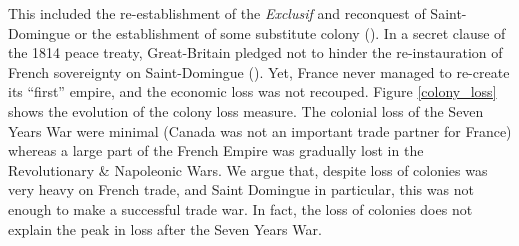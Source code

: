 \documentclass[12pt,a4paper,notitlepage,english]{article}
\begin{document}
This included the re-establishment of the \textit{Exclusif} and reconquest of Saint-Domingue or the establishment of some substitute colony (\cite{Todd2011}). In a secret clause of the 1814 peace treaty, Great-Britain pledged not to hinder the re-instauration of French sovereignty on Saint-Domingue (\cite{Schefer1907}). Yet, France never managed to re-create its ``first'' empire, and the economic loss was not recouped.
Figure \ref{colony_loss} shows the evolution of the colony loss measure. The colonial loss of the Seven Years War were minimal (Canada was not an important trade partner for France) whereas a large part of the French Empire was gradually lost in the Revolutionary \& Napoleonic Wars. We argue that, despite loss of colonies was very heavy on French trade, and Saint Domingue in particular, this was not enough to make a successful trade war. In fact, the loss of colonies does not explain the peak in loss after the Seven Years War.  
\end{document}

